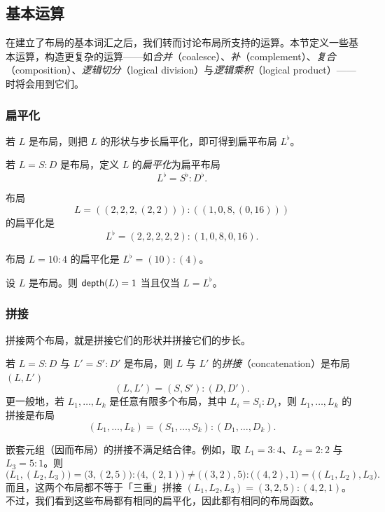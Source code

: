 \subsection{基本运算}

在建立了布局的基本词汇之后，我们转而讨论布局所支持的运算。本节定义一些基本运算，构造更复杂的运算——如{\it 合并}（coalesce）、{\it 补}（complement）、{\it 复合}（composition）、{\it 逻辑切分}（logical division）与{\it 逻辑乘积}（logical product）——时将会用到它们。

\subsubsection{扁平化} 若 $L$ 是布局，则把 $L$ 的形状与步长扁平化，即可得到扁平布局 $L^\flat$。
\begin{definition}
    若 $L = S:D$ 是布局，定义 $L$ 的{\it 扁平化}为扁平布局
    \[
    L^\flat = S^\flat : D^\flat.
    \]
\end{definition}

\begin{example}
布局
    \[
    L = ((2,2,2,(2,2))) : ((1,0,8,(0,16)))
    \]
    的扁平化是
    \[
    L^\flat = (2,2,2,2,2) : (1,0,8,0,16).
    \]
\end{example}

\begin{example}
    布局 $L = 10:4$ 的扁平化是 $L^\flat = (10):(4)$。
\end{example}


\begin{example}
    设 $L$ 是布局。则 $\mathsf{depth}(L) = 1$ 当且仅当 $L = L^\flat$。
\end{example}

\subsubsection{拼接}

拼接两个布局，就是拼接它们的形状并拼接它们的步长。


\begin{definition}\label{definitionoflayoutconcatenation}
    若 $L=S:D$ 与 $L'=S':D'$ 是布局，则 $L$ 与 $L'$ 的{\it 拼接}（concatenation）是布局 $(L,L')$
    \[
    (L,L') = (S,S'):(D,D').
    \]
    更一般地，若 $L_1,\dots,L_k$ 是任意有限多个布局，其中 $L_i = S_i:D_i$，则 $L_1,\dots,L_k$ 的拼接是布局
    \[
    (L_1,\dots,L_k) = (S_1,\dots,S_k):(D_1,\dots,D_k).
    \]
\end{definition}

\begin{remark}
    嵌套元组（因而布局）的拼接不满足结合律。例如，取 $L_1 = 3:4$、$L_2 = 2:2$ 与 $L_3 = 5:1$。则
    \[\bigl(L_1, (L_2, L_3)\bigr) = \bigl(3, (2, 5)\bigr):\bigl(4, (2, 1)\bigr) \neq \bigl((3, 2), 5\bigr):\bigl((4, 2), 1\bigr) = \bigl((L_1, L_2), L_3\bigr). \]
    而且，这两个布局都不等于「三重」拼接 $(L_1,L_2,L_3) = (3,2,5):(4,2,1)$。不过，我们看到这些布局都有相同的扁平化，因此都有相同的布局函数。
\end{remark}

